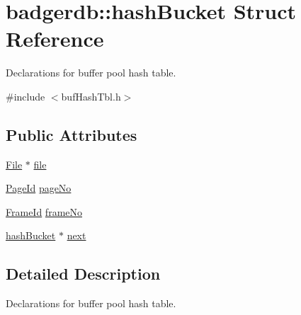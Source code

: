 \hypertarget{structbadgerdb_1_1hashBucket}{\section{badgerdb\-:\-:hash\-Bucket Struct Reference}
\label{structbadgerdb_1_1hashBucket}
}


Declarations for buffer pool hash table.  




{\ttfamily \#include $<$buf\-Hash\-Tbl.\-h$>$}

\subsection*{Public Attributes}
\begin{DoxyCompactItemize}
\item 
\hyperlink{classbadgerdb_1_1File}{File} $\ast$ \hyperlink{structbadgerdb_1_1hashBucket_a756f18d35180fe074060633a76e9d27f}{file}
\item 
\hyperlink{namespacebadgerdb_a1f49e404293bf4240756b89b53b1587a}{Page\-Id} \hyperlink{structbadgerdb_1_1hashBucket_af81c5ca74d02362df3fab9bd4c471da5}{page\-No}
\item 
\hyperlink{namespacebadgerdb_a1e7378fbefaea050a47e6cde929e9c01}{Frame\-Id} \hyperlink{structbadgerdb_1_1hashBucket_ab1b34471afe07b208150c805ac83b0b6}{frame\-No}
\item 
\hyperlink{structbadgerdb_1_1hashBucket}{hash\-Bucket} $\ast$ \hyperlink{structbadgerdb_1_1hashBucket_aca2ab1451a26b84317cb28f99793d43c}{next}
\end{DoxyCompactItemize}


\subsection{Detailed Description}
Declarations for buffer pool hash table. 


